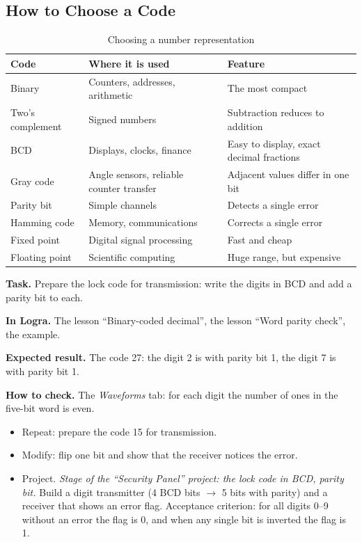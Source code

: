 \subsection{How to Choose a Code}

\begin{table}[H]
\centering
\caption{Choosing a number representation}
\small
\begin{tabularx}{\textwidth}{l X X}
\toprule
\textbf{Code} & \textbf{Where it is used} & \textbf{Feature} \\
\midrule
Binary & Counters, addresses, arithmetic & The most compact \\
Two's complement & Signed numbers & Subtraction reduces to addition \\
BCD & Displays, clocks, finance & Easy to display, exact decimal fractions \\
Gray code & Angle sensors, reliable counter transfer & Adjacent values differ in one bit \\
Parity bit & Simple channels & Detects a single error \\
Hamming code & Memory, communications & Corrects a single error \\
Fixed point & Digital signal processing & Fast and cheap \\
Floating point & Scientific computing & Huge range, but expensive \\
\bottomrule
\end{tabularx}
\end{table}

\begin{diybox}
\textbf{Task.} Prepare the lock code for transmission: write the digits in BCD and
add a parity bit to each.\par
\textbf{In Logra.} The lesson ``Binary-coded decimal'', the lesson ``Word parity check'',
the  example.\par
\textbf{Expected result.} The code 27: the digit 2 is  with parity
bit 1, the digit 7 is  with parity bit 1.\par
\textbf{How to check.} The \emph{Waveforms} tab: for each digit the number of
ones in the five-bit word is even.
\begin{itemize}[leftmargin=3.4em,labelwidth=3em,labelsep=0.4em,align=left]
  \item[\stars{1}] Repeat: prepare the code 15 for transmission.
  \item[\stars{2}] Modify: flip one bit and show that the receiver
    notices the error.
  \item[\stars{3}] Project. \emph{Stage of the ``Security Panel'' project: the lock code in BCD,
    parity bit.} Build a digit transmitter (4 BCD bits $\to$ 5 bits with
    parity) and a receiver that shows an error flag. Acceptance
    criterion: for all digits 0--9 without an error the flag is 0, and when
    any single bit is inverted the flag is 1.
\end{itemize}
\end{diybox}

